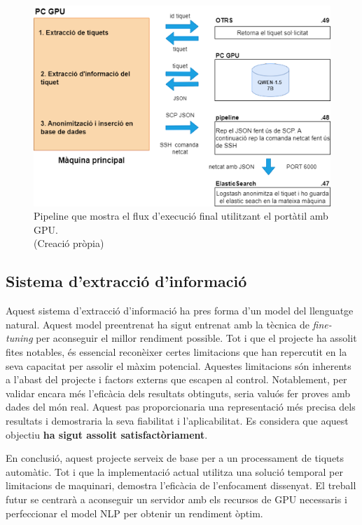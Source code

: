 \begin{figure}[H]
    \centering
    \includegraphics[width=\textwidth]{pipeline_flux_real.png}
    \caption[Pipeline mostra el flux d'execució final]{Pipeline que mostra el flux d'execució final utilitzant el portàtil amb GPU. \\ (Creació pròpia)}
    \label{fig:pipeline_flux_real}
\end{figure}



\subsection{Sistema d'extracció d'informació}
Aquest sistema d'extracció d'informació ha pres forma d'un model del llenguatge natural. Aquest model preentrenat ha sigut entrenat amb la tècnica de \textit{fine-tuning} per aconseguir el millor rendiment possible. Tot i que el projecte ha assolit fites notables, és essencial reconèixer certes limitacions que han repercutit en la seva capacitat per assolir el màxim potencial. Aquestes limitacions són inherents a l'abast del projecte i factors externs que escapen al control. Notablement, per validar encara més l'eficàcia dels resultats obtinguts, seria valuós fer proves amb dades del món real. Aquest pas proporcionaria una representació més precisa dels resultats i demostraria la seva fiabilitat i l'aplicabilitat. Es considera que aquest objectiu \textbf{ha sigut assolit satisfactòriament}.

En conclusió, aquest projecte serveix de base per a un processament de tiquets automàtic. Tot i que la implementació actual utilitza una solució temporal per limitacions de maquinari, demostra l'eficàcia de l'enfocament dissenyat. El treball futur se centrarà a aconseguir un servidor amb els recursos de GPU necessaris i perfeccionar el model NLP per obtenir un rendiment òptim.

